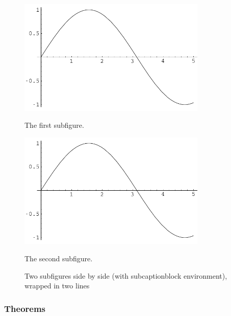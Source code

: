 \documentclass[English]{APSart}
\begin{document}
	\begin{figure}[H]
		\centering
		\begin{subcaptionblock}{0.45\textwidth}	
			\centering
			\includegraphics[width=0.8\textwidth]{figs/sin.pdf}
			\caption{The first subfigure.}\label{mini:sube} 
		\end{subcaptionblock}%
		\begin{subcaptionblock}{0.45\textwidth}	
			\centering
			\includegraphics[width=0.8\textwidth]{figs/sin.pdf}
			\caption{The second subfigure.}\label{mini:subf} 
		\end{subcaptionblock}	
		\caption{Two subfigures side by side (with subcaptionblock environment), wrapped in two lines}\label{mini:subfigures} 
	\end{figure}



\subsubsection{Theorems}
\end{document}
